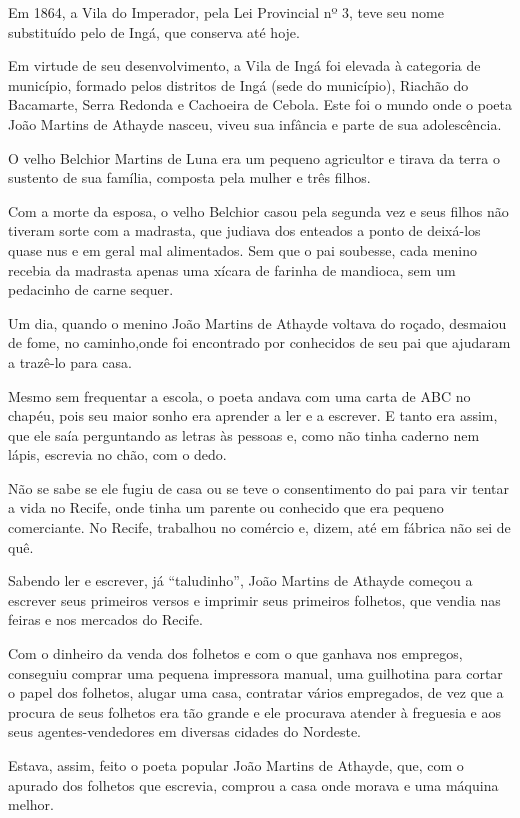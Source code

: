 Em 1864, a Vila do Imperador, pela Lei Provincial nº
3, teve seu nome substituído pelo de Ingá, que conserva
até hoje.

Em virtude de seu desenvolvimento, a Vila de Ingá foi
elevada à categoria de município, formado pelos distritos
de Ingá (sede do município), Riachão do Bacamarte, Serra
Redonda e Cachoeira de Cebola. Este foi o mundo onde o
poeta João Martins de Athayde nasceu, viveu sua infância
e parte de sua adolescência.

O velho Belchior Martins de Luna era um pequeno
agricultor e tirava da terra o sustento de sua família,
composta pela mulher e três filhos.

Com a morte da esposa, o velho Belchior casou pela
segunda vez e seus filhos não tiveram sorte com a madrasta,
que judiava dos enteados a ponto de deixá-los quase nus e
em geral mal alimentados. Sem que o pai soubesse, cada
menino recebia da madrasta apenas uma xícara de farinha
de mandioca, sem um pedacinho de carne sequer.

Um dia, quando o menino João Martins de Athayde
voltava do roçado, desmaiou de fome, no caminho,onde
foi encontrado por conhecidos de seu pai que ajudaram a
trazê-lo para casa.

Mesmo sem frequentar a escola, o poeta andava com
uma carta de ABC no chapéu, pois seu maior sonho era
aprender a ler e a escrever. E tanto era assim, que ele saía
perguntando as letras às pessoas e, como não tinha caderno
nem lápis, escrevia no chão, com o dedo.

Não se sabe se ele fugiu de casa ou se teve o
consentimento do pai para vir tentar a vida no Recife, onde
tinha um parente ou conhecido que era pequeno
comerciante. No Recife, trabalhou no comércio e, dizem,
até em fábrica não sei de quê.

Sabendo ler e escrever, já ``taludinho'', João Martins de
Athayde começou a escrever seus primeiros versos e
imprimir seus primeiros folhetos, que vendia nas feiras e
nos mercados do Recife.

Com o dinheiro da venda dos folhetos e com o que
ganhava nos empregos, conseguiu comprar uma pequena
impressora manual, uma guilhotina para cortar o papel
dos folhetos, alugar uma casa, contratar vários empregados,
de vez que a procura de seus folhetos era tão grande e ele
procurava atender à freguesia e aos seus 
agentes-vendedores em diversas cidades do Nordeste.

Estava, assim, feito o poeta popular João Martins de
Athayde, que, com o apurado dos folhetos que escrevia,
comprou a casa onde morava e uma máquina melhor.

